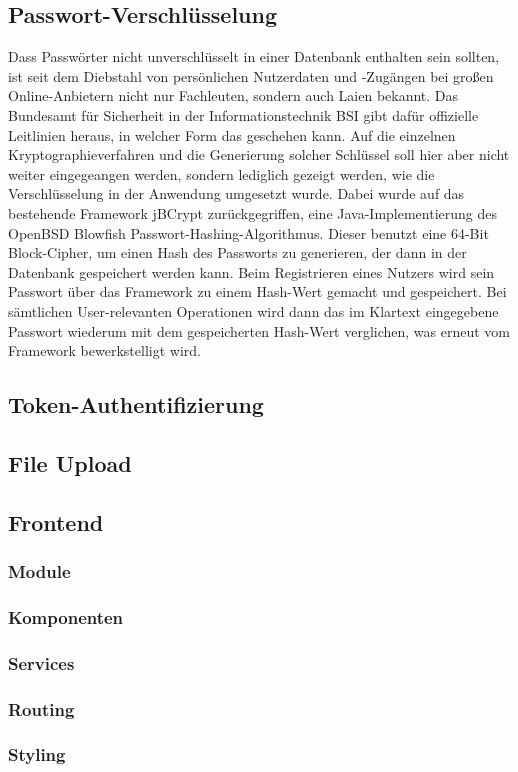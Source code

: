\subsection{Passwort-Verschlüsselung}
Dass Passwörter nicht unverschlüsselt in einer Datenbank enthalten sein sollten, ist seit dem Diebstahl von persönlichen Nutzerdaten und -Zugängen bei großen Online-Anbietern nicht nur Fachleuten, sondern auch Laien bekannt.
Das Bundesamt für Sicherheit in der Informationstechnik \acs{BSI} gibt dafür offizielle Leitlinien heraus, in welcher Form das geschehen kann. \cite{BSI2016}
Auf die einzelnen Kryptographieverfahren und die Generierung solcher Schlüssel soll hier aber nicht weiter eingegeangen werden, sondern lediglich gezeigt werden, wie die Verschlüsselung in der Anwendung umgesetzt wurde.
Dabei wurde auf das bestehende Framework jBCrypt zurückgegriffen, eine Java-Implementierung des OpenBSD Blowfish Passwort-Hashing-Algorithmus. \cite{jBCrypt2015}
Dieser benutzt eine 64-Bit Block-Cipher, um einen Hash des Passworts zu generieren, der dann in der Datenbank gespeichert werden kann. \cite{Provos}
Beim Registrieren eines Nutzers wird sein Passwort über das Framework zu einem Hash-Wert gemacht und gespeichert.
Bei sämtlichen User-relevanten Operationen wird dann das im Klartext eingegebene Passwort wiederum mit dem gespeicherten Hash-Wert verglichen, was erneut vom Framework bewerkstelligt wird.
\subsection{Token-Authentifizierung}

\subsection{File Upload}
\subsection{Frontend}

\subsubsection{Module}

\subsubsection{Komponenten}

\subsubsection{Services}

\subsubsection{Routing}

\subsubsection{Styling}
